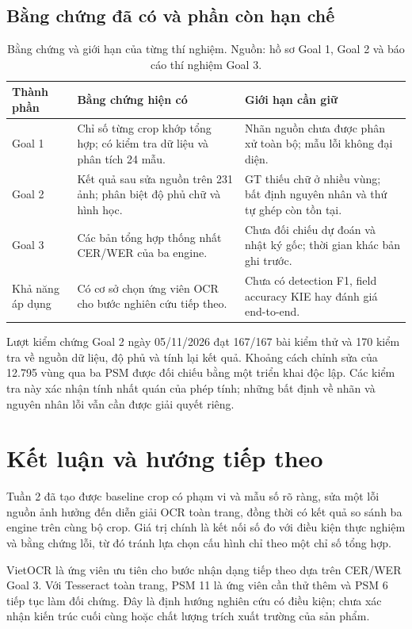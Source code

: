 \documentclass[11pt,a4paper]{article}
\begin{document}
\subsection{Bằng chứng đã có và phần còn hạn chế}
\begin{table}[H]
\caption{Bằng chứng và giới hạn của từng thí nghiệm. Nguồn: hồ sơ Goal 1, Goal 2 và báo cáo thí nghiệm Goal 3.}
\begin{tabularx}{\linewidth}{@{}P{29mm}YY@{}}
\toprule
\textbf{Thành phần} & \textbf{Bằng chứng hiện có} & \textbf{Giới hạn cần giữ}\\\midrule
Goal 1 & Chỉ số từng crop khớp tổng hợp; có kiểm tra dữ liệu và phân tích 24 mẫu. & Nhãn nguồn chưa được phân xử toàn bộ; mẫu lỗi không đại diện.\\
Goal 2 & Kết quả sau sửa nguồn trên 231 ảnh; phân biệt độ phủ chữ và hình học. & GT thiếu chữ ở nhiều vùng; bất định nguyên nhân và thứ tự ghép còn tồn tại.\\
Goal 3 & Các bản tổng hợp thống nhất CER/WER của ba engine. & Chưa đối chiếu dự đoán và nhật ký gốc; thời gian khác bản ghi trước.\\
Khả năng áp dụng & Có cơ sở chọn ứng viên OCR cho bước nghiên cứu tiếp theo. & Chưa có detection F1, field accuracy KIE hay đánh giá end-to-end.\\
\bottomrule
\end{tabularx}
\end{table}

Lượt kiểm chứng Goal 2 ngày 05/11/2026 đạt 167/167 bài kiểm thử và 170 kiểm tra về nguồn dữ liệu, độ phủ và tính lại kết quả. Khoảng cách chỉnh sửa của 12.795 vùng qua ba PSM được đối chiếu bằng một triển khai độc lập. Các kiểm tra này xác nhận tính nhất quán của phép tính; những bất định về nhãn và nguyên nhân lỗi vẫn cần được giải quyết riêng.

\clearpage
\section{Kết luận và hướng tiếp theo}
Tuần 2 đã tạo được baseline crop có phạm vi và mẫu số rõ ràng, sửa một lỗi nguồn ảnh hưởng đến diễn giải OCR toàn trang, đồng thời có kết quả so sánh ba engine trên cùng bộ crop. Giá trị chính là kết nối số đo với điều kiện thực nghiệm và bằng chứng lỗi, từ đó tránh lựa chọn cấu hình chỉ theo một chỉ số tổng hợp.

VietOCR là ứng viên ưu tiên cho bước nhận dạng tiếp theo dựa trên CER/WER Goal 3. Với Tesseract toàn trang, PSM 11 là ứng viên cần thử thêm và PSM 6 tiếp tục làm đối chứng. Đây là định hướng nghiên cứu có điều kiện; chưa xác nhận kiến trúc cuối cùng hoặc chất lượng trích xuất trường của sản phẩm.
\end{document}

